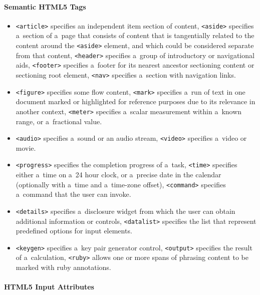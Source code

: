\paragraph{Semantic HTML5 Tags}

\begin{itemize}
  \item \texttt{<article>} specifies an independent item
        section of content,
        \texttt{<aside>} specifies a~section of a~page that
        consists of content that is tangentially related
        to the content around the \texttt{<aside>} element,
        and which could be considered separate from
        that content, \texttt{<header>} specifies a~group of
        introductory or navigational aids,
        \texttt{<footer>} specifies a~footer for its nearest
        ancestor sectioning content or sectioning root element,
        \texttt{<nav>} specifies a~section with navigation links.
  \item \texttt{<figure>} specifies some flow content,
        \texttt{<mark>} specifies a~run of text in one document
        marked or highlighted for reference purposes
        due to its relevance in another context,
        \texttt{<meter>} specifies a~scalar measurement within
        a~known range, or a~fractional value.
  \item \texttt{<audio>} specifies a~sound or an audio stream,
        \texttt{<video>} specifies a~video or movie.
  \item \texttt{<progress>} specifies the completion progress
        of a~task, \texttt{<time>} specifies either a~time
        on a~24 hour clock, or a~precise date in the calendar
        (optionally with a~time and a~time-zone offset),
        \texttt{<command>} specifies a~command that the user
        can invoke.
  \item \texttt{<details>} specifies a~disclosure widget
        from which the user can obtain additional information or
        controls, \texttt{<datalist>} specifies the list that
        represent predefined options for input elements.
  \item \texttt{<keygen>} specifies a~key pair generator control,
        \texttt{<output>} specifies the result of a~calculation,
        \texttt{<ruby>} allows one or more spans of phrasing
        content to be marked with ruby annotations.
\end{itemize}

\paragraph{HTML5 Input Attributes}

